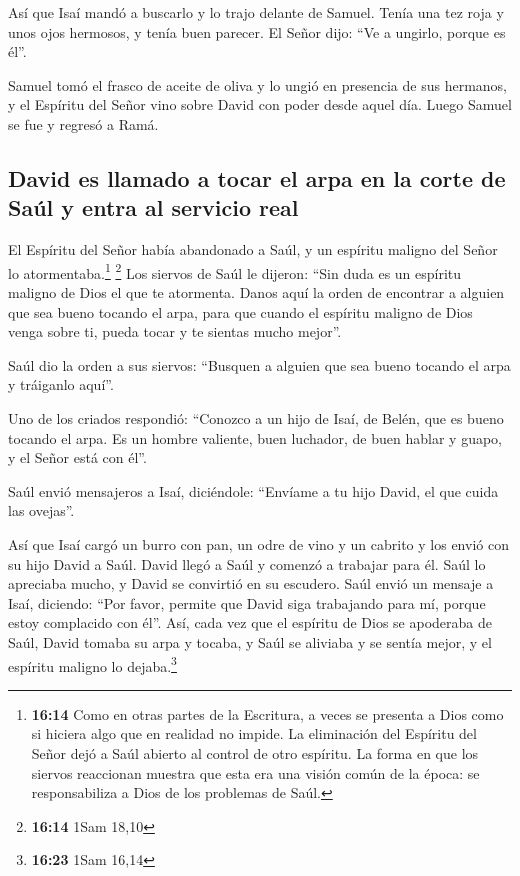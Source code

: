  Así que Isaí mandó a buscarlo y lo trajo delante de
Samuel. Tenía una tez roja y unos ojos hermosos, y tenía buen parecer.
El Señor dijo: ``Ve a ungirlo, porque es él''.

 Samuel tomó el frasco de aceite de oliva y lo ungió en
presencia de sus hermanos, y el Espíritu del Señor vino sobre David con
poder desde aquel día. Luego Samuel se fue y regresó a Ramá.

\hypertarget{david-es-llamado-a-tocar-el-arpa-en-la-corte-de-sauxfal-y-entra-al-servicio-real}{%
\subsection{David es llamado a tocar el arpa en la corte de Saúl y entra
al servicio
real}\label{david-es-llamado-a-tocar-el-arpa-en-la-corte-de-sauxfal-y-entra-al-servicio-real}}

 El Espíritu del Señor había abandonado a Saúl, y un
espíritu maligno del Señor lo atormentaba.\footnote{\textbf{16:14} Como
  en otras partes de la Escritura, a veces se presenta a Dios como si
  hiciera algo que en realidad no impide. La eliminación del Espíritu
  del Señor dejó a Saúl abierto al control de otro espíritu. La forma en
  que los siervos reaccionan muestra que esta era una visión común de la
  época: se responsabiliza a Dios de los problemas de Saúl.} \footnote{\textbf{16:14}
  1Sam 18,10}  Los siervos de Saúl le dijeron: ``Sin duda
es un espíritu maligno de Dios el que te atormenta. 
Danos aquí la orden de encontrar a alguien que sea bueno tocando el
arpa, para que cuando el espíritu maligno de Dios venga sobre ti, pueda
tocar y te sientas mucho mejor''.

 Saúl dio la orden a sus siervos: ``Busquen a alguien que
sea bueno tocando el arpa y tráiganlo aquí''.

 Uno de los criados respondió: ``Conozco a un hijo de
Isaí, de Belén, que es bueno tocando el arpa. Es un hombre valiente,
buen luchador, de buen hablar y guapo, y el Señor está con él''.

 Saúl envió mensajeros a Isaí, diciéndole: ``Envíame a tu
hijo David, el que cuida las ovejas''.

 Así que Isaí cargó un burro con pan, un odre de vino y
un cabrito y los envió con su hijo David a Saúl.  David
llegó a Saúl y comenzó a trabajar para él. Saúl lo apreciaba mucho, y
David se convirtió en su escudero.  Saúl envió un mensaje
a Isaí, diciendo: ``Por favor, permite que David siga trabajando para
mí, porque estoy complacido con él''.  Así, cada vez que
el espíritu de Dios se apoderaba de Saúl, David tomaba su arpa y tocaba,
y Saúl se aliviaba y se sentía mejor, y el espíritu maligno lo
dejaba.\footnote{\textbf{16:23} 1Sam 16,14}

